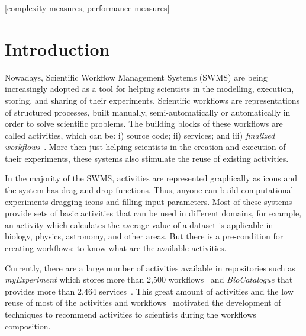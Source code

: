 \documentclass{sig-alternate-05-2015}
\begin{document}
[complexity measures, performance measures]



\section{Introduction}\label{INTRODUCAO}
Nowadays, Scientific Workflow Management Systems (SWMS) are being increasingly adopted as a tool for helping scientists in the modelling, execution, storing, and sharing of their experiments. Scientific workflows are representations of structured processes, built manually, semi-automatically or automatically in order to solve scientific problems. The building blocks of these workflows are called activities, which can be: i) source code; ii) services; and iii) \emph{finalized workflows}~\cite{Wang2010}. More then just helping scientists in the creation and execution of their experiments, these systems also stimulate the reuse of existing activities.

In the majority of the SWMS, activities are represented graphically as icons and the system has drag and drop functions. Thus, anyone can build computational experiments dragging icons and filling input parameters. Most of these systems provide sets of basic activities that can be used in different domains, for example, an activity which calculates the average value of a dataset is applicable in biology, physics, astronomy, and other areas. But there is a pre-condition for creating workflows: to know what are the available activities.

Currently, there are a large number of activities available in repositories such as \emph{myExperiment} which stores more than 2,500 workflows~\cite{myExperiment} and \emph{BioCatalogue} that provides more than 2,464 services~\cite{Biocatalogue}. This great amount of activities and the low reuse of most of the activities and workflows~\cite{Wang2010} motivated the development of techniques to recommend activities to scientists during the workflows composition.
\end{document}

